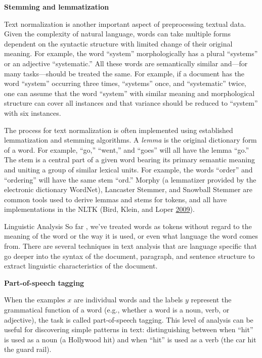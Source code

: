 \documentclass[]{krantz}
\begin{document}
\textbf{Stemming and lemmatization}

Text normalization is another important aspect of preprocessing textual
data. Given the complexity of natural language, words can take multiple
forms dependent on the syntactic structure with limited change of their
original meaning. For example, the word ``system'' morphologically has a
plural ``systems'' or an adjective ``systematic.'' All these words are
semantically similar and---for many tasks---should be treated the same.
For example, if a document has the word ``system'' occurring three
times, ``systems'' once, and ``systematic'' twice, one can assume that
the word ``system'' with similar meaning and morphological structure can
cover all instances and that variance should be reduced to ``system''
with six instances.

The process for text normalization is often implemented using
established lemmatization and stemming algorithms. A \emph{lemma} is the
original dictionary form of a word. For example, ``go,'' ``went,'' and
``goes'' will all have the lemma ``go.'' The stem is a central part of a
given word bearing its primary semantic meaning and uniting a group of
similar lexical units. For example, the words ``order'' and ``ordering''
will have the same stem ``ord.'' Morphy (a lemmatizer provided by the
electronic dictionary WordNet), Lancaster Stemmer, and Snowball Stemmer
are common tools used to derive lemmas and stems for tokens, and all
have implementations in the NLTK (Bird, Klein, and Loper
\protect\hyperlink{ref-bird-09}{2009}).

Linguistic Analysis So far , we've treated words as tokens without
regard to the meaning of the word or the way it is used, or even what
language the word comes from. There are several techniques in text
analysis that are language specific that go deeper into the syntax of
the document, paragraph, and sentence structure to extract linguistic
characteristics of the document.

\vspace*{-2pt} \textbf{Part-of-speech tagging}

When the examples \(x\) are individual words and the labels \(y\)
represent the grammatical function of a word (e.g., whether a word is a
noun, verb, or adjective), the task is called part-of-speech tagging.
This level of analysis can be useful for discovering simple patterns in
text: distinguishing between when ``hit'' is used as a noun (a Hollywood
hit) and when ``hit'' is used as a verb (the car hit the guard rail).
\end{document}
